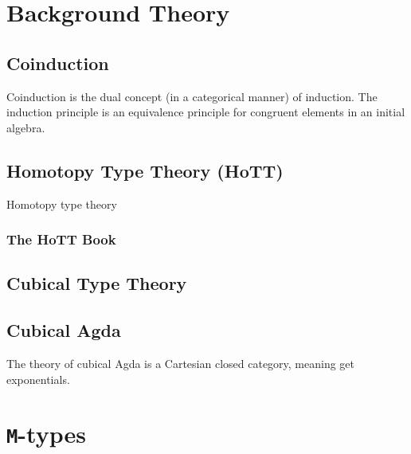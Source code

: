 \documentclass[twoside,11pt,openright]{report}
\theoremstyle{plain} %
\theoremstyle{definition}
\theoremstyle{remark}
\begin{document}

\chapter{Background Theory}
\section{Coinduction}
Coinduction is the dual concept (in a categorical manner) of induction. The induction principle is an equivalence principle for congruent elements in an initial algebra.

\section{Homotopy Type Theory (HoTT)}
Homotopy type theory 
\subsection{The HoTT Book}

\section{Cubical Type Theory}

\section{Cubical Agda}
The theory of cubical Agda is a Cartesian closed category, meaning get exponentials.


\chapter{\texttt{M}-types}
\label{ch:m-types}
\end{document}
